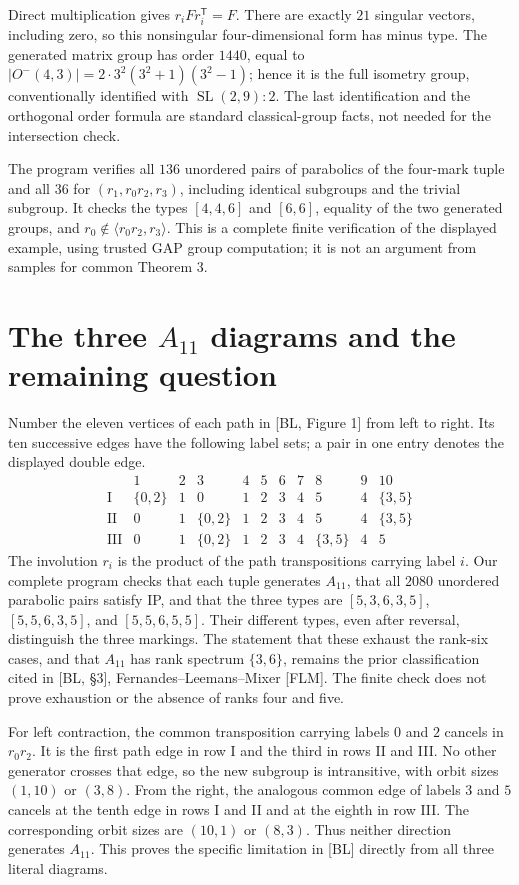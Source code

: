 \documentclass[a4paper,11pt]{article}
\newcommand{\gen}[1]{\langle#1\rangle}
\begin{document}
Direct multiplication gives $r_iFr_i^{\mathsf T}=F$. There are exactly
$21$ singular vectors, including zero, so this nonsingular four-dimensional
form has minus type. The generated matrix group has order $1440$, equal
to $|O^-(4,3)|=2\cdot3^2(3^2+1)(3^2-1)$; hence it is the full isometry
group, conventionally identified with $\operatorname{SL}(2,9):2$.
The last identification and the orthogonal order formula are standard
classical-group facts, not needed for the intersection check.

The program verifies all $136$ unordered pairs of parabolics of the
four-mark tuple and all $36$ for $(r_1,r_0r_2,r_3)$, including identical
subgroups and the trivial subgroup. It checks the types $[4,4,6]$ and
$[6,6]$, equality of the two generated groups, and
$r_0\notin\gen{r_0r_2,r_3}$. This is a complete finite verification of
the displayed example, using trusted GAP group computation; it is not
an argument from samples for common Theorem 3.

\section{The three $A_{11}$ diagrams and the remaining question}
Number the eleven vertices of each path in [BL, Figure 1] from left to
right. Its ten successive edges have the following label sets; a pair in
one entry denotes the displayed double edge.
\[
\begin{array}{c|llllllllll}
 &1&2&3&4&5&6&7&8&9&10\\\hline
\mathrm I&\{0,2\}&1&0&1&2&3&4&5&4&\{3,5\}\\
\mathrm {II}&0&1&\{0,2\}&1&2&3&4&5&4&\{3,5\}\\
\mathrm {III}&0&1&\{0,2\}&1&2&3&4&\{3,5\}&4&5
\end{array}
\]
The involution $r_i$ is the product of the path transpositions carrying
label $i$. Our complete program checks that each tuple generates $A_{11}$,
that all $2080$ unordered parabolic pairs satisfy IP, and that the three
types are $[5,3,6,3,5]$, $[5,5,6,3,5]$, and $[5,5,6,5,5]$.
Their different types, even after reversal, distinguish the three markings.
The statement that these exhaust the rank-six cases, and that $A_{11}$
has rank spectrum $\{3,6\}$, remains the prior classification cited in
[BL, \S3], Fernandes--Leemans--Mixer [FLM]. The finite check does not
prove exhaustion or the absence of ranks four and five.

For left contraction, the common transposition carrying labels $0$ and $2$
cancels in $r_0r_2$. It is the first path edge in row I and the third in
rows II and III. No other generator crosses that edge, so the new subgroup
is intransitive, with orbit sizes $(1,10)$ or $(3,8)$. From the right,
the analogous common edge of labels $3$ and $5$ cancels at the tenth edge
in rows I and II and at the eighth in row III. The corresponding orbit
sizes are $(10,1)$ or $(8,3)$. Thus neither direction generates $A_{11}$.
This proves the specific limitation in [BL] directly from all three
literal diagrams.
\end{document}
